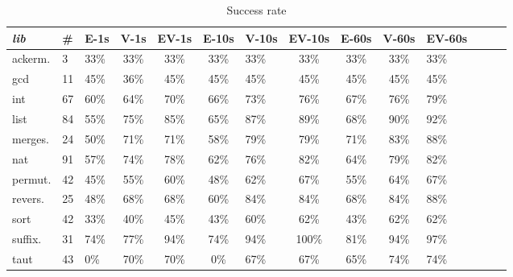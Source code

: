 \begin{table}
    \centering
    \begin{tabular}{|l|l|l|c|c|c|l|c|c|c|l|c|c|c|} \hline
    \textit{lib}&{\#}&E-1s&  V-1s&EV-1s&  E-10s&  V-10s&  EV-10s&  E-60s&  V-60s& EV-60s\\ \hline
ackerm. &3 &33\% &33\% &33\% &33\% &33\% &33\% &33\% &33\% &33\%\\ \hline
gcd &11 &45\% &36\% &45\% &45\% &45\% &45\% &45\% &45\% &45\%\\ \hline
int &67 &60\% &64\% &70\% &66\% &73\% &76\% &67\% &76\% &79\%\\ \hline
list &84 &55\% &75\% &85\% &65\% &87\% &89\% &68\% &90\% &92\%\\ \hline
merges. &24 &50\% &71\% &71\% &58\% &79\% &79\% &71\% &83\% &88\%\\ \hline
nat &91 &57\% &74\% &78\% &62\% &76\% &82\% &64\% &79\% &82\%\\ \hline
permut. &42 &45\% &55\% &60\% &48\% &62\% &67\% &55\% &64\% &67\%\\ \hline
revers. &25 &48\% &68\% &68\% &60\% &84\% &84\% &68\% &84\% &88\%\\ \hline
sort &42 &33\% &40\% &45\% &43\% &60\% &62\% &43\% &62\% &62\%\\ \hline
suffix. &31 &74\% &77\% &94\% &74\% &94\% &100\% &81\% &94\% &97\%\\ \hline
taut &43 &0\% &70\% &70\% &0\% &67\% &67\% &65\% &74\% &74\%\\ \hline
    \end{tabular}
    \caption{Success rate}
    \label{tab:success_rate}
\end{table}